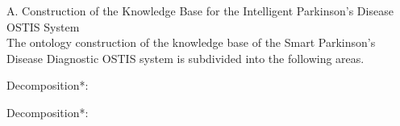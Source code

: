 \documentclass[10pt,two column]{article}
\begin{document}
A. \hspace{0.1cm} Construction of the Knowledge Base for the Intelligent Parkinson’s Disease OSTIS System \\
The ontology construction of the knowledge base of
the Smart Parkinson’s Disease Diagnostic OSTIS system
is subdivided into the following areas.
\begin{SCn}
\begin{scnrelfromset}{Decomposition*:}{
    \begin{scnindent}
     \begin{scnrelfromset}{Decomposition*:}{
    }
    \end{scnrelfromset}
    \end{scnindent}
}
\end{scnrelfromset}
\newpage


\end{SCn}
\end{document}
